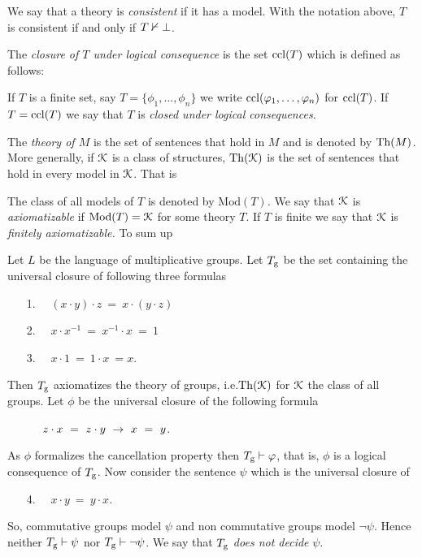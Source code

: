 We say that a theory is \emph{consistent\/} if it has a model.
With the notation above, $T$ is consistent if and only if \emph{$T\nvdash\bot$.}


The \emph{closure of $T$ under logical consequence\/} is the set ${\rm ccl}(T)$ which is defined as follows:  


If $T$ is a finite set, say $T=\big\{\phi_1,\dots,\phi_n\big\}$ we write ${\rm ccl}(\varphi_1,\dots,\varphi_n)$ for ${\rm ccl}(T)$.
If $T={\rm ccl}(T)$ we say that $T$ is \emph{closed under logical consequences.}

The \emph{theory of $M$\/} is the set of sentences that hold in $M$ and is denoted by \emph{${\rm Th}(M)$.}
More generally, if $\EuScript K$ is a class of structures, \emph{${\rm Th}(\EuScript K)$} is the set of sentences that hold in every model in $\EuScript K$.
That is


The class of all models of $T$ is denoted by \emph{$\textrm{Mod}(T)$.}
We say that $\EuScript K$ is \emph{axiomatizable\/} if $\mathop{\rm Mod}(T)=\EuScript K$ for some theory $T$.
If $T$ is finite we say that $\EuScript K$ is \emph{finitely axiomatizable.}
To sum up





\begin{example}\label{Tg}
Let $L$ be the language of multiplicative groups.
Let $T_{\rm g}$ be the set containing the universal closure of following three formulas
\begin{itemize}
\item[1.]\ \  $(x\cdot y)\cdot z\ =\ x\cdot(y\cdot z)$
\item[2.]\ \  $ x\cdot x^{-1}\ =\ x^{-1}\cdot x\ =\ 1$
\item[3.]\ \  $x\cdot 1\ =\ 1\cdot x\ =x$.
\end{itemize}
Then $T_{\rm g}$ axiomatizes the theory of groups, i.e.\@ ${\rm Th}(\EuScript K)$ for $\EuScript K$ the class of all groups.
Let $\phi$ be the universal closure of the following formula
\begin{itemize}
\item[]\ \  $\ z\cdot x\ =\  z\cdot y\ \imp\ x\ =\ y$.
\end{itemize}
As $\phi$ formalizes the cancellation property then $T_{\rm g} \vdash\varphi$, that is, $\phi$ is a logical consequence of $T_{\rm g}$.
Now consider the sentence $\psi$ which is the universal closure of
\begin{itemize}
\item[4.]\ \  $x\cdot y\ =\ y\cdot x$.
\end{itemize}
So, commutative groups model $\psi$ and non commutative groups model $\neg\psi$.
Hence neither $T_{\rm g}\vdash\psi$ nor $T_{\rm g}\vdash\neg\psi$.
We say that $T_{\rm g}$ \emph{does not decide\/} $\psi$.
\end{example}

